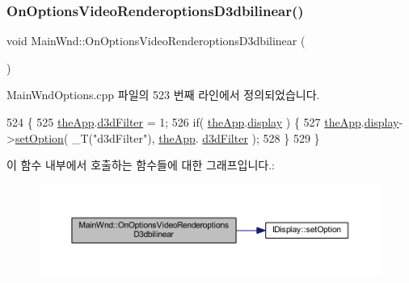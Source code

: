 \subsubsection{\texorpdfstring{On\+Options\+Video\+Renderoptions\+D3dbilinear()}{OnOptionsVideoRenderoptionsD3dbilinear()}}
{\footnotesize\ttfamily void Main\+Wnd\+::\+On\+Options\+Video\+Renderoptions\+D3dbilinear (\begin{DoxyParamCaption}{ }\end{DoxyParamCaption})\hspace{0.3cm}{\ttfamily [protected]}}



Main\+Wnd\+Options.\+cpp 파일의 523 번째 라인에서 정의되었습니다.


\begin{DoxyCode}
524 \{
525     \mbox{\hyperlink{_v_b_a_8cpp_a8095a9d06b37a7efe3723f3218ad8fb3}{theApp}}.\mbox{\hyperlink{class_v_b_a_a8563e53b73a28a011e656f6fc8a4e5ff}{d3dFilter}} = 1;
526     \textcolor{keywordflow}{if}( \mbox{\hyperlink{_v_b_a_8cpp_a8095a9d06b37a7efe3723f3218ad8fb3}{theApp}}.\mbox{\hyperlink{class_v_b_a_a940e5bad8b3ed2436888dbcd03bfd563}{display}} ) \{
527         \mbox{\hyperlink{_v_b_a_8cpp_a8095a9d06b37a7efe3723f3218ad8fb3}{theApp}}.\mbox{\hyperlink{class_v_b_a_a940e5bad8b3ed2436888dbcd03bfd563}{display}}->\mbox{\hyperlink{class_i_display_a1766244708c252bb8781892c76c20ba9}{setOption}}( \_T(\textcolor{stringliteral}{"d3dFilter"}), \mbox{\hyperlink{_v_b_a_8cpp_a8095a9d06b37a7efe3723f3218ad8fb3}{theApp}}.
      \mbox{\hyperlink{class_v_b_a_a8563e53b73a28a011e656f6fc8a4e5ff}{d3dFilter}} );
528     \}
529 \}
\end{DoxyCode}
이 함수 내부에서 호출하는 함수들에 대한 그래프입니다.\+:
\nopagebreak
\begin{figure}[H]
\begin{center}
\leavevmode
\includegraphics[width=350pt]{class_main_wnd_abc93855509cbfc4d8c063d7be9d765d4_cgraph}
\end{center}
\end{figure}
\mbox{\label{class_main_wnd_add9253b241396c29c979ef81199b7fb3}} 
